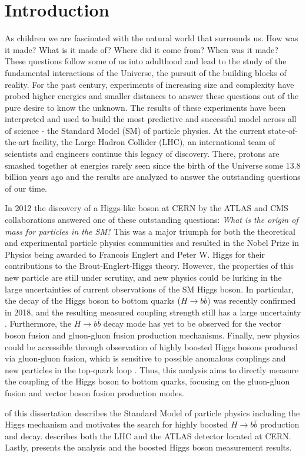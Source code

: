 \chapter{Introduction} \label{sec:intro}
As children we are fascinated with the natural world that surrounds us.  How
was it made? What is it made of? Where did it come from?  When was it made?
These questions follow some of us into adulthood and lead to the study of the
fundamental interactions of the Universe, the pursuit of the building blocks of
reality.  For the past century, experiments of increasing size and complexity
have probed higher energies and smaller distances to answer these questions out
of the pure desire to know the unknown.  The results of these experiments have
been interpreted and used to build the most predictive and successful model
across all of science - the Standard Model (SM) of particle physics. At the
current state-of-the-art facility, the Large Hadron Collider (LHC), an
international team of scientists and engineers continue this legacy of
discovery.  There, protons are smashed together at energies rarely seen since the
birth of the Universe some 13.8 billion years ago and the results are analyzed
to answer the outstanding questions of our time.

In 2012 the discovery of a Higgs-like boson \cite{Higgs:1964ia, Higgs:1964pj,
Higgs:1966ev, Englert:1964et, Guralnik:1964eu} at CERN by the ATLAS and CMS
\cite{Aad:2012tfa,Chatrchyan:2012xdj} collaborations answered one of these
outstanding questions: \textit{What is the origin of mass for particles in the
SM}?  This was a major triumph for both the theoretical and experimental
particle physics communities and resulted in the Nobel Prize in Physics being
awarded to Francois Englert and Peter W. Higgs for their contributions to the
Brout-Englert-Higgs theory. However, the properties of this new particle are
still under scrutiny, and new physics could be lurking in the large
uncertainties of current observations of the SM Higgs boson.  In particular,
the decay of the Higgs boson to bottom quarks ($H \rightarrow b\bar{b}$) was
recently confirmed in 2018, and the resulting measured coupling strength still
has a large uncertainty \cite{HIGG-2018-04, CMS:2018abb}. Furthermore, the $H
\rightarrow b\bar{b}$ decay mode has yet to be observed for the vector boson
fusion and gluon-gluon fusion production mechanisms.  Finally, new physics
could be accessible through observation of highly boosted Higgs bosons produced
via gluon-gluon fusion, which is sensitive to possible anomalous couplings and
new particles in the top-quark loop
\cite{Schlaffer:2014osa,Grojean:2013nya,Grazzini:2016paz}.  Thus, this analysis
aims to directly measure the coupling of the Higgs boson to bottom quarks,
focusing on the gluon-gluon fusion and vector boson fusion production modes. 

 of this dissertation describes the Standard Model of
particle physics including the Higgs mechanism and motivates the search for
highly boosted $H \rightarrow b\bar{b}$ production and decay.
 describes both the LHC and the ATLAS detector located at
CERN. Lastly,  presents the analysis and the boosted
Higgs boson measurement results.
